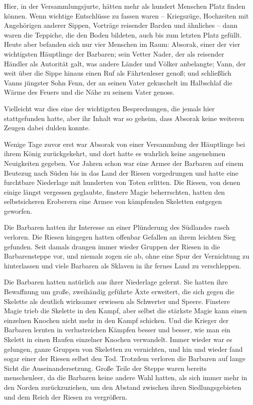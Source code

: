 \documentclass[10pt, a4paper, oneside]{book}
\begin{document}
\begin{multicols}{2}
Hier, in der Versammlungsjurte, hätten mehr als hundert Menschen Platz finden können. Wenn wichtige Entschlüsse zu fassen waren – Kriegszüge, Hochzeiten mit Angehörigen anderer Sippen, Vorträge reisender Barden und ähnliches – dann waren die Teppiche, die den Boden bildeten, auch bis zum letzten Platz gefüllt. Heute aber befanden sich nur vier Menschen im Raum: Absorak, einer der vier wichtigsten Häuptlinge der Barbaren; sein Vetter Nader, der als reisender Händler als Autorität galt, was andere Länder und Völker anbelangte; Vann, der weit über die Sippe hinaus einen Ruf als Fährtenleser genoß; und schließlich Vanns jüngster Sohn Fenn, der an seinen Vater gekuschelt im Halbschlaf die Wärme des Feuers und die Nähe zu seinem Vater genoss.

Vielleicht war dies eine der wichtigsten Besprechungen, die jemals hier stattgefunden hatte, aber ihr Inhalt war so geheim, dass Absorak keine weiteren Zeugen dabei dulden konnte.

Wenige Tage zuvor erst war Absorak von einer Versammlung der Häuptlinge bei ihrem König zurückgekehrt, und dort hatte es wahrlich keine angenehmen Neuigkeiten gegeben. Vor Jahren schon war eine Armee der Barbaren auf einem Beutezug nach Süden bis in das Land der Riesen vorgedrungen und hatte eine furchtbare Niederlage mit hunderten von Toten erlitten. Die Riesen, von denen einige längst vergessen geglaubte, finstere Magie beherrschten, hatten den selbstsicheren Eroberern eine Armee von kämpfenden Skeletten entgegen geworfen.

Die Barbaren hatten ihr Interesse an einer Plünderung des Südlandes rasch verloren. Die Riesen hingegen hatten offenbar Gefallen an ihrem leichten Sieg gefunden. Seit damals drangen immer wieder Gruppen der Riesen in die Barbarensteppe vor, und niemals zogen sie ab, ohne eine Spur der Vernichtung zu hinterlassen und viele Barbaren als Sklaven in ihr fernes Land zu verschleppen.

Die Barbaren hatten natürlich aus ihrer Niederlage gelernt. Sie hatten ihre Bewaffnung um große, zweihändig geführte Äxte erweitert, die sich gegen die Skelette als deutlich wirksamer erwiesen als Schwerter und Speere. Finstere Magie trieb die Skelette in den Kampf, aber selbst die stärkste Magie kann einen einzelnen Knochen nicht mehr in den Kampf schicken. Und die Krieger der Barbaren lernten in verlustreichen Kämpfen besser und besser, wie man ein Skelett in einen Haufen einzelner Knochen verwandelt. Immer wieder war es gelungen, ganze Gruppen von Skeletten zu vernichten, und hin und wieder fand sogar einer der Riesen selbst den Tod. Trotzdem verloren die Barbaren auf lange Sicht die Auseinandersetzung. Große Teile der Steppe waren bereits menschenleer, da die Barbaren keine andere Wahl hatten, als sich immer mehr in den Norden zurückzuziehen, um den Abstand zwischen ihren Siedlungsgebieten und dem Reich der Riesen zu vergrößern.


\end{multicols}
\end{document}
